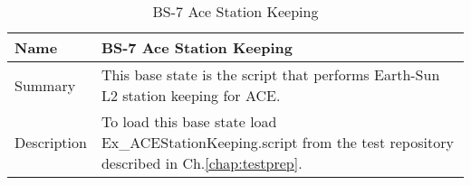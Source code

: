 \begin{table}[htbp!]
\centering
      \begin{tabular}{|p{1.05 in} |p{4.75 in} |}
      \hline
         \rowcolor[rgb]{0.8,0.8,0.8} Name & BS-7 Ace Station Keeping \\
         \hline
         Summary &
         This base state is the script that performs Earth-Sun L2 station keeping for ACE.
         \\ \hline
         Description &
          To load this base state load Ex\_ACEStationKeeping.script from the test repository described in Ch.\ref{chap:testprep}.
         \\ \hline
\end{tabular}
      \label{Table: BS-7}
      \caption{BS-7 Ace Station Keeping }
\end{table}